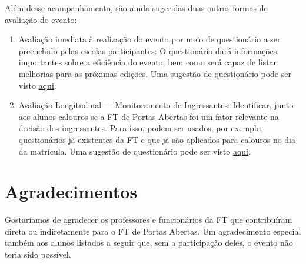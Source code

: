 \documentclass[
  letterpaper,
  DIV=11,
  numbers=noendperiod]{scrreprt}
\begin{document}
Além desse acompanhamento, são ainda sugeridas duas outras formas de
avaliação do evento:

\begin{enumerate}
\def\labelenumi{\arabic{enumi}.}
\item
  Avaliação imediata à realização do evento por meio de questionário a
  ser preenchido pelas escolas participantes: O questionário dará
  informações importantes sobre a eficiência do evento, bem como será
  capaz de listar melhorias para as próximas edições. Uma sugestão de
  questionário pode ser visto \href{questionario-1.txt}{aqui}.
\item
  Avaliação Longitudinal --- Monitoramento de Ingressantes: Identificar,
  junto aos alunos calouros se a FT de Portas Abertas foi um fator
  relevante na decisão dos ingressantes. Para isso, podem ser usados,
  por exemplo, questionários já existentes da FT e que já são aplicados
  para calouros no dia da matrícula. Uma sugestão de questionário pode
  ser visto \href{./questionario-2.txt}{aqui}.
\end{enumerate}

\chapter{Agradecimentos}\label{agradecimentos}

Gostaríamos de agradecer os professores e funcionários da FT que
contribuíram direta ou indiretamente para o FT de Portas Abertas. Um
agradecimento especial também aos alunos listados a seguir que, sem a
participação deles, o evento não teria sido possível.
\end{document}
